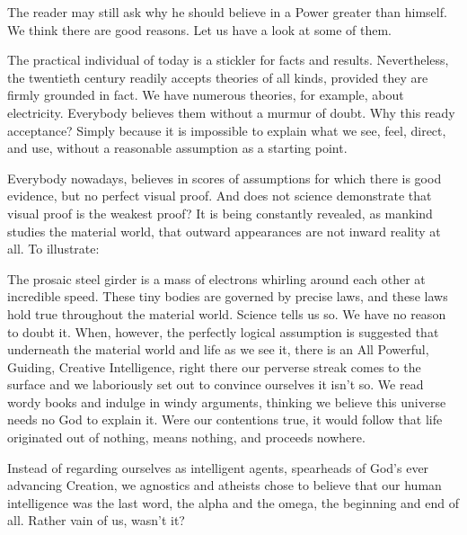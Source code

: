 \begin{biblechapter}
    The reader may still ask why he should believe in a Power greater than himself. 
We think there are good reasons. 
Let us have a look at some of them.

The practical individual of today is a stickler for facts and results. 
Nevertheless, the twentieth century readily accepts theories of all kinds, 
provided they are firmly grounded in fact. 
We have numerous theories, for example, about electricity. 
Everybody believes them without a murmur of doubt. 
Why this ready acceptance? 
Simply because it is impossible to explain what we see, feel, direct, and use, 
without a reasonable assumption as a starting point.

Everybody nowadays, believes in scores of assumptions 
for which there is good evidence, but no perfect visual proof. 
And does not science demonstrate that visual proof is the weakest proof? 
It is being constantly revealed, as mankind studies the material world, 
that outward appearances are not inward reality at all. 
To illustrate:

The prosaic steel girder is a mass of electrons whirling around each other at incredible speed. 
These tiny bodies are governed by precise laws, and these laws hold true throughout the material world. 
Science tells us so. 
We have no reason to doubt it. 
When, however, the perfectly logical assumption is suggested that underneath the material world and life as we see it, 
there is an All Powerful, Guiding, Creative Intelligence, 
right there our perverse streak comes to the surface 
and we laboriously set out to convince ourselves it isn't so. 
We read wordy books and indulge in windy arguments, thinking we believe this universe needs no God to explain it. 
Were our contentions true, it would follow that life originated out of nothing, means nothing, and proceeds nowhere.

Instead of regarding ourselves as intelligent agents, 
spearheads of God's ever advancing Creation, 
we agnostics and atheists chose to believe that our human intelligence was the last word, 
the alpha and the omega, 
the beginning and end of all. 
Rather vain of us, wasn't it?
\end{biblechapter}


